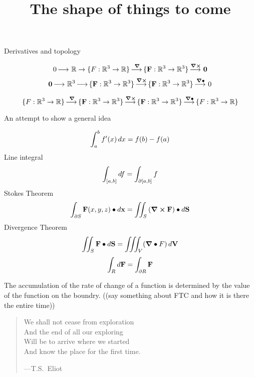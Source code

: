 \documentclass{ximera}
\title[Dig-In:]{The shape of things to come}
\newcommand{\lto}{\mathop{\longrightarrow\,}\limits}
\begin{document}
\begin{abstract}
\end{abstract}
\maketitle


Derivatives and topology

\[
0 \lto \R \to \{F:\R^3 \to \R\} \lto^{\grad} \{\vec{F}: \R^3 \to \R^3\} \lto^{\curl} \vec{0}
\]
\[
\vec{0}\lto \R^3\lto \{\vec{F}: \R^3 \to \R^3\}\lto^{\curl} \{\vec{F}:\R^3 \to \R^3\} \lto^{\divergence} 0
\]

\[
\{F:\R^3 \to \R\} \lto^{\grad} \{\vec{F}: \R^3 \to \R^3\} \lto^{\curl}
\{\vec{F}:\R^3 \to \R^3\} \lto^{\divergence} \{F:\R^3 \to \R\}
\]

An attempt to show a general idea

\[
\int_a^b f'(x) \mathop{}\!d x = f(b) - f(a)
\]
Line integral
\[
\int_{[a,b]} \mathop{}\!d f = \int_{\partial[a,b]} f
\]
Stokes Theorem
\[
\int_{\partial S} \mathbf{F}(x,y,z)\bullet \mathop{}\!d \mathbf{x} = \iint_S \left(\boldsymbol\nabla\boldsymbol\times\mathbf{F}\right)\bullet \mathop{}\!d \mathbf{S}
\]
Divergence Theorem
\[
\iint_S \mathbf{F}\bullet \mathop{}\!d \mathbf{S} = \iiint_V (\boldsymbol\nabla\bullet F) \mathop{}\!d \mathbf{V}
\]
\[
\int_R \mathop{}\!d \mathbf{F} = \int_{\partial R} \mathbf{F}
\]

The accumulation of the rate of change of a function is determined by
the value of the function on the boundry. ((say something about FTC and how it is there the entire time))

\begin{quote}
  We shall not cease from exploration\\
  And the end of all our exploring \\
  Will be to arrive where we started \\
  And know the place for the first time.

  \hfill ---T.S.\ Eliot
\end{quote}
\end{document}
